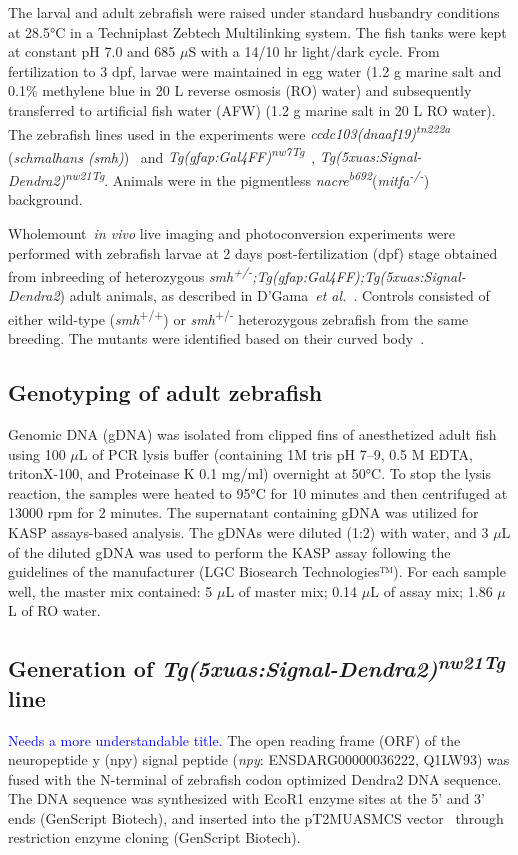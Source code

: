 \documentclass[fleqn]{wlscirep}
\newcommand{\lyng}[1]{\textcolor{blue}{#1}}
\begin{document}
The larval and adult zebrafish were raised under standard husbandry conditions at 28.5°C in a Techniplast Zebtech Multilinking system.
The fish tanks were kept at constant pH 7.0 and 685 $\mu$S with a 14/10 hr light/dark cycle.
From fertilization to 3 dpf, larvae were maintained in egg water (1.2 g marine salt and 0.1\% methylene blue in 20 L reverse osmosis (RO) water)
and subsequently transferred to artificial fish water (AFW) (1.2 g marine salt in 20 L RO water).
The zebrafish lines used in the experiments were \emph{ccdc103(dnaaf19)\textsuperscript{tn222a}} (\emph{schmalhans (smh)})~\cite{Jau-NianChen1997Left-rightZebrafish}
and \emph{Tg(gfap:Gal4FF)\textsuperscript{nw7Tg}}~\cite{DiazVerdugo2019Glia-neuronSeizures}, \emph{Tg(5xuas:Signal-Dendra2)\textsuperscript{nw21Tg}}.
Animals were in the pigmentless \emph{nacre\textsuperscript{b692}}(\emph{mitfa\textsuperscript{-/-}})~\cite{JamesA.Lister1999NacreFate} background.

Wholemount~\emph{in vivo} live imaging and photoconversion experiments were performed with zebrafish larvae at 2 days post-fertilization (dpf) stage obtained from inbreeding of heterozygous
\emph{smh\textsuperscript{+/-};Tg(gfap:Gal4FF);Tg(5xuas:Signal-Dendra2}) adult animals, as described in D'Gama~\emph{et al.}~\cite{DGama2024Cilia-mediatedBrain}.
Controls consisted of either wild-type (\emph{smh}\textsuperscript{+/+}) or \emph{smh}\textsuperscript{+/-} heterozygous zebrafish from the same breeding.
The mutants were identified based on their curved body~\cite{Jau-NianChen1997Left-rightZebrafish}.

\subsection*{Genotyping of adult zebrafish}
Genomic DNA (gDNA) was isolated from clipped fins of anesthetized adult fish using 100 $\mu$L of PCR lysis buffer (containing 1M tris pH 7--9, 0.5 M EDTA, tritonX-100, and Proteinase K 0.1 mg/ml) overnight at 50°C.
To stop the lysis reaction, the samples were heated to 95°C for 10 minutes and then centrifuged at 13000 rpm for 2 minutes.
The supernatant containing gDNA was utilized for KASP assays-based analysis.
The gDNAs were diluted (1:2) with water, and 3 $\mu$L of the diluted gDNA was used to perform the KASP assay following the guidelines of the manufacturer (LGC Biosearch Technologies™).
For each sample well, the master mix contained: 5 $\mu$L of master mix; 0.14 $\mu$L of assay mix; 1.86 $\mu$L of RO water.

\subsection*{Generation of \emph{Tg(5xuas:Signal-Dendra2)\textsuperscript{nw21Tg}} line}
\lyng{Needs a more understandable title.}
The open reading frame (ORF) of the neuropeptide y (npy) signal peptide (\emph{npy}: ENSDARG00000036222, Q1LW93) was fused with the N-terminal of zebrafish codon optimized Dendra2 DNA sequence.
The DNA sequence was synthesized with EcoR1 enzyme sites at the 5’ and 3’ ends (GenScript Biotech),
and inserted into the pT2MUASMCS vector~\cite{Asakawa2008GeneticZebrafish} through restriction enzyme cloning (GenScript Biotech). 
\end{document}
